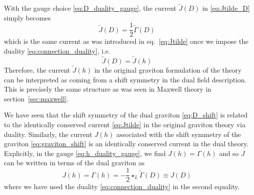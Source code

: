 With the gauge choice \eqref{eq:D_duality_gauge}, the current $\tilde{J}(D)$ in \eqref{eq:Jtilde_D} simply becomes
\begin{equation}
    \tilde{J}(D) = \frac{1}{2} \tilde{\Gamma}(D)
\end{equation}
which is the same current as was introduced in eq.~\eqref{eq:Jtilde} once we impose the duality \eqref{eq:connection_duality}, i.e.
\begin{equation}
    \tilde{J}(D) = \tilde{J}(h)
\end{equation}
Therefore, the current $\tilde{J}(h)$ in the original graviton formulation of the theory can be interpreted as coming from a shift symmetry in the dual field description. This is precisely the same structure as was seen in Maxwell theory in section~\ref{sec:maxwell}.

We have seen that the shift symmetry of the dual graviton \eqref{eq:D_shift} is related to the identically conserved current \eqref{eq:Jtilde} in the original graviton theory via duality.
Similarly, the current $J(h)$ associated with the shift symmetry of the graviton \eqref{eq:graviton_shift} is an identically conserved current in the dual theory. Explicitly, in the gauge \eqref{eq:h_duality_gauge}, we find $J(h) = \Gamma(h)$ and so $J$ can be written in terms of the dual graviton as
\begin{equation}
    J(h) = \Gamma(h) = - \frac{1}{2} \star_L \tilde{\Gamma}(D) \equiv J(D)
\end{equation}
where we have used the duality \eqref{eq:connection_duality} in the second equality. 
